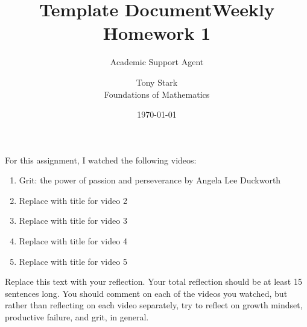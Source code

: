 \documentclass{article}
\title{Template Document}
\author{Academic Support Agent}
\date{\today}
\begin{document}
\maketitle

 
\title{Weekly Homework 1}
\author{Tony Stark\\ %
Foundations of Mathematics}

\maketitle

\noindent For this assignment, I watched the following videos:

\begin{enumerate} %
\item Grit: the power of passion and perseverance by Angela Lee Duckworth  
\item Replace with title for video 2
\item Replace with title for video 3
\item Replace with title for video 4
\item Replace with title for video 5
\end{enumerate}

Replace this text with your reflection.  Your total reflection should be at least 15 sentences long. You should comment on each of the videos you watched, but rather than reflecting on each video separately, try to reflect on growth mindset, productive failure, and grit, in general.
 
\end{document}
